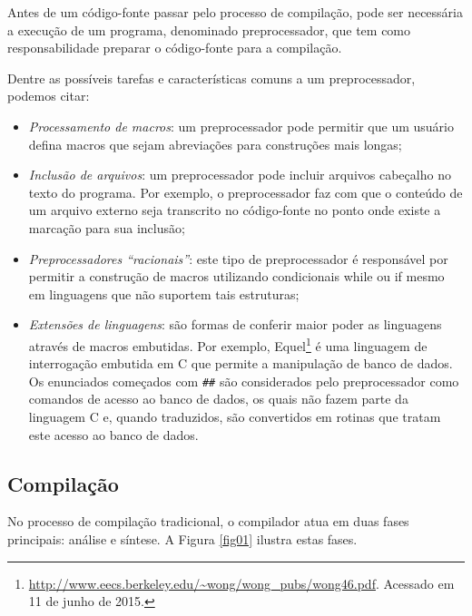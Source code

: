 Antes de um código-fonte passar pelo processo de compilação, pode ser
 necessária a execução de um programa, denominado preprocessador, que
 tem como responsabilidade preparar o código-fonte para a compilação. 

Dentre as possíveis tarefas e características comuns a um preprocessador,
 podemos citar:

\begin{itemize}

\item \textit{Processamento de macros}: um preprocessador pode permitir que um usuário 
    defina macros que sejam abreviações para construções mais longas\cite{ref11};

\item \textit{Inclusão de arquivos}: um preprocessador pode incluir arquivos cabeçalho no
     texto do programa. Por exemplo, o preprocessador faz com que o conteúdo de
     um arquivo externo seja transcrito no código-fonte no ponto onde existe a 
    marcação para sua inclusão\cite{ref11};

\item \textit{Preprocessadores “racionais”}: este tipo de preprocessador é responsável 
    por permitir a construção de macros utilizando condicionais while ou if mesmo
     em linguagens que não suportem tais estruturas\cite{ref11};

\item \textit{Extensões de linguagens}: são formas de conferir maior poder as linguagens
     através de macros embutidas. Por exemplo, 
    Equel\footnote{\url{http://www.eecs.berkeley.edu/~wong/wong\_pubs/wong46.pdf}. Acessado em 11 de junho de 2015.} é uma linguagem de 
    interrogação embutida em C que permite a manipulação de banco de dados. 
    Os enunciados começados com \texttt{\#\#} são considerados pelo preprocessador como
     comandos de acesso ao banco de dados, os quais não fazem parte da 
    linguagem C e, quando traduzidos, são convertidos em rotinas que tratam 
    este acesso ao banco de dados\cite{ref11}.

\end{itemize}

\subsection{Compilação}

No processo de compilação tradicional, o compilador atua em duas fases 
principais: análise\cite{ref12} e síntese\cite{ref13}. A Figura \ref{fig01}
 ilustra estas fases. 

